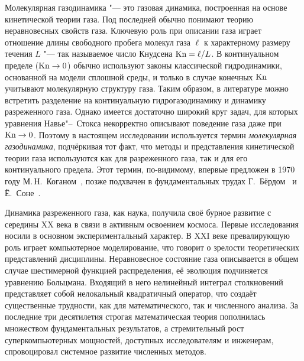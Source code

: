Молекулярная газодинамика "--- это газовая динамика, построенная на основе кинетической теории газа.
Под последней обычно понимают теорию неравновесных свойств газа.
Ключевую роль при описании газа играет отношение длины свободного пробега молекул газа \(\ell\)
к характерному размеру течения \(L\) "--- так называемое число Кнудсена \(\mathrm{Kn}=\ell/L\).
В континуальном пределе (\(\mathrm{Kn}\to0\)) обычно используют законы классической гидродинамики,
основанной на модели сплошной среды, и только в случае конечных \(\mathrm{Kn}\)
учитывают молекулярную структуру газа. Таким образом, в литературе можно встретить
разделение на континуальную гидрогазодинамику и динамику разреженного газа.
Однако имеется достаточно широкий круг задач, для которых уравнения Навье"--~Стокса
некорректно описывают поведение газа даже при \(\mathrm{Kn}\to0\).
Поэтому в настоящем исследовании используется термин \emph{молекулярная газодинамика},
подчёркивая тот факт, что методы и представления кинетической теории газа используются
как для разреженного газа, так и для его континуального предела.
Этот термин, по-видимому, впервые предложен в 1970 году М.\,Н.~Коганом~\autocite{Kogan1971review},
позже подхвачен в фундаментальных трудах Г.~Бёрдом~\autocite{Bird1981} и Ё.~Соне~\autocite{Sone2007}.

{\actuality}
Динамика разреженного газа, как наука, получила своё бурное развитие с середины XX века
в связи в активным освоением космоса. Первые исследования носили в основном экспериментальный
характер. В XXI веке превалирующую роль играет компьютерное моделирование, что
говорит о зрелости теоретических представлений дисциплины.
Неравновесное состояние газа описывается в общем случае шестимерной функцией распределения,
её эволюция подчиняется уравнению Больцмана.
Входящий в него нелинейный интеграл столкновений представляет собой нелокальный квадратичный оператор,
что создаёт существенные трудности, как для математического, так и численного анализа.
За последние три десятилетия строгая математическая теория пополнилась множеством фундаментальных результатов,
а стремительный рост суперкомпьютерных мощностей, доступных исследователям и инженерам,
спровоцировал системное развитие численных методов.

